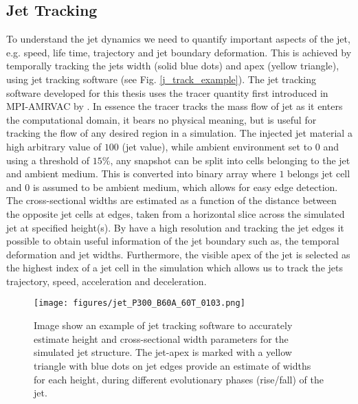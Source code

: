 \documentclass[12pt]{ociamthesis}
\newcommand{\fref}[1]{Fig. \eqref{#1}}
\begin{document}
\subsection{Jet Tracking}
\label{subsec:jet_tracking}
To understand the jet dynamics we need to quantify important aspects of the jet, e.g. speed, life time, trajectory and jet boundary deformation. This is achieved by temporally tracking the jets width (solid blue dots) and apex (yellow triangle), using jet tracking software (see \fref{j_track_example}). The jet tracking software developed for this thesis uses the tracer quantity first introduced in MPI-AMRVAC by \cite{Porth_2014}. In essence the tracer tracks the mass flow of jet as it enters the computational domain, it bears no physical meaning, but is useful for tracking the flow of any desired region in a simulation. The injected jet material a high arbitrary value of $100$ (jet value), while ambient environment set to 0 and using a threshold of $15\%$, any snapshot can be split into cells belonging to the jet and ambient medium. This is converted into binary array where $1$ belongs jet cell and $0$ is assumed to be ambient medium, which allows for easy edge detection. The cross-sectional widths are estimated as a function of the distance between the opposite jet cells at edges, taken from a horizontal slice across the simulated jet at specified height(s). By have a high resolution and tracking the jet edges it possible to obtain useful information of the jet boundary such as, the temporal deformation and jet widths. Furthermore, the visible apex of the jet is selected as the highest index of a jet cell in the simulation which allows us to track the jets trajectory, speed, acceleration and deceleration. 
\begin{figure}
\centering
{\texttt{[image: figures/jet\_P300\_B60A\_60T\_0103.png]}} 
\caption{Image show an example of jet tracking software to accurately estimate height and cross-sectional width parameters for the simulated jet structure. The jet-apex is marked with a yellow triangle with blue dots on jet edges provide an estimate of widths for each height, during different evolutionary phases (rise/fall) of the jet.}
\label{jet_tracker}
\end{figure}
\end{document}
